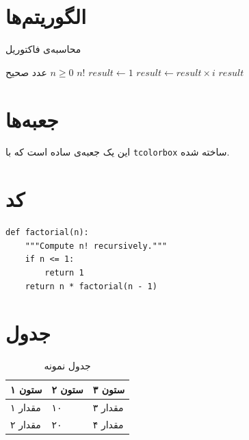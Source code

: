 \documentclass{matinbook}
\begin{document}
\section{الگوریتم‌ها}
\label{sec:algorithms}

\begin{latin}
\begin{algorithm}
\caption{محاسبه‌ی فاکتوریل}
\begin{algorithmic}[1]
    \Require عدد صحیح $n \geq 0$
    \Ensure $n!$
    \State $result \gets 1$
        \State $result \gets result \times i$
    \EndFor
    \State \Return $result$
\end{algorithmic}
\end{algorithm}
\end{latin}

\section{جعبه‌ها}
\label{sec:boxes}

\begin{tcolorbox}[title=جعبه‌ی نمونه]
این یک جعبه‌ی ساده است که با \texttt{tcolorbox} ساخته شده.
\end{tcolorbox}

\section{کد}
\label{sec:code}

\begin{latin}
\begin{verbatim}
def factorial(n):
    """Compute n! recursively."""
    if n <= 1:
        return 1
    return n * factorial(n - 1)
\end{verbatim}
\end{latin}

\section{جدول}
\label{sec:tables}

\begin{table}[h]
\centering
\caption{جدول نمونه}
\label{tab:core-test}
\begin{tabular}{L{3cm} C{2cm} R{3cm}}
\toprule
\textbf{ستون ۱} & \textbf{ستون ۲} & \textbf{ستون ۳} \\
\midrule
مقدار ۱ & ۱۰ & مقدار ۳ \\
مقدار ۲ & ۲۰ & مقدار ۴ \\
\bottomrule
\end{tabular}
\end{table}
\end{document}
